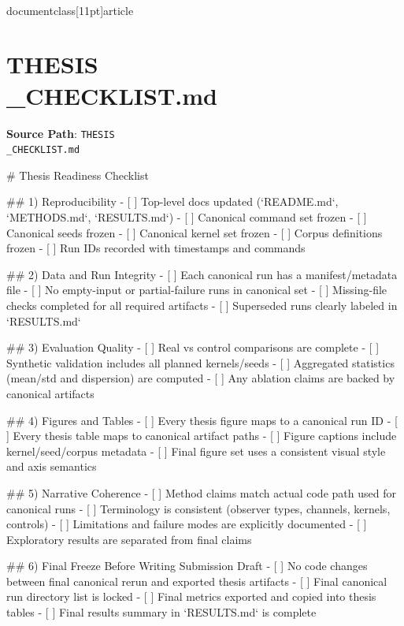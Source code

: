 \\documentclass[11pt]{article}
\begin{document}
\section*{THESIS\\_CHECKLIST.md}
\textbf{Source Path}: \texttt{THESIS\\_CHECKLIST.md}\par
\bigskip
\begin{CodeBlock}
# Thesis Readiness Checklist

## 1) Reproducibility
- [ ] Top-level docs updated (`README.md`, `METHODS.md`, `RESULTS.md`)
- [ ] Canonical command set frozen
- [ ] Canonical seeds frozen
- [ ] Canonical kernel set frozen
- [ ] Corpus definitions frozen
- [ ] Run IDs recorded with timestamps and commands

## 2) Data and Run Integrity
- [ ] Each canonical run has a manifest/metadata file
- [ ] No empty-input or partial-failure runs in canonical set
- [ ] Missing-file checks completed for all required artifacts
- [ ] Superseded runs clearly labeled in `RESULTS.md`

## 3) Evaluation Quality
- [ ] Real vs control comparisons are complete
- [ ] Synthetic validation includes all planned kernels/seeds
- [ ] Aggregated statistics (mean/std and dispersion) are computed
- [ ] Any ablation claims are backed by canonical artifacts

## 4) Figures and Tables
- [ ] Every thesis figure maps to a canonical run ID
- [ ] Every thesis table maps to canonical artifact paths
- [ ] Figure captions include kernel/seed/corpus metadata
- [ ] Final figure set uses a consistent visual style and axis semantics

## 5) Narrative Coherence
- [ ] Method claims match actual code path used for canonical runs
- [ ] Terminology is consistent (observer types, channels, kernels, controls)
- [ ] Limitations and failure modes are explicitly documented
- [ ] Exploratory results are separated from final claims

## 6) Final Freeze Before Writing Submission Draft
- [ ] No code changes between final canonical rerun and exported thesis artifacts
- [ ] Final canonical run directory list is locked
- [ ] Final metrics exported and copied into thesis tables
- [ ] Final results summary in `RESULTS.md` is complete

\end{CodeBlock}
\end{document}
